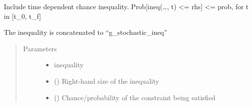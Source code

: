 \documentclass[letterpaper,10pt,english]{sphinxmanual}
\begin{document}
\begin{fulllineitems}

\begin{fulllineitems}
\label{\detokenize{yaocptool.modelling:yaocptool.modelling.stochastic_ocp.StochasticOCP.get_p_without_p_unc}}
\end{fulllineitems}


\begin{fulllineitems}
\label{\detokenize{yaocptool.modelling:yaocptool.modelling.stochastic_ocp.StochasticOCP.get_uncertain_initial_cond_indices}}
\end{fulllineitems}


\begin{fulllineitems}
\label{\detokenize{yaocptool.modelling:yaocptool.modelling.stochastic_ocp.StochasticOCP.include_time_chance_inequality}}
Include time dependent chance inequality.
Prob{[}ineq(…, t) \textless{}= rhs{]} \textless{}= prob, for t in {[}t\_0, t\_f{]}

The inequality is concatenated to “g\_stochastic\_ineq”
\begin{quote}\begin{description}
\item[{Parameters}] \leavevmode\begin{itemize}
\item {} 
 \textendash{} inequality

\item {} 
 () \textendash{} Right-hand size of the inequality

\item {} 
 () \textendash{} Chance/probability of the constraint being satisfied


\end{itemize}
\end{description}
\end{quote}
\end{fulllineitems}
\end{fulllineitems}
\end{document}
